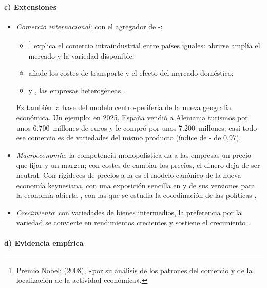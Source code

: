 \documentclass[11pt]{article}
\begin{document}
\paragraph{c) Extensiones}

\begin{itemize}
\item \emph{Comercio internacional}: con el agregador de -:
  \begin{itemize}
  \item \textcite{Krugman1979Increasing}\footnote{Premio Nobel:  (2008), «por su análisis de los patrones del comercio y de la localización de la actividad económica»\nocite{Nobel2008Krugman}.} explica el comercio intraindustrial entre países iguales: abrirse amplía el mercado y la variedad disponible;
  \item \textcite{Krugman1980Scale} añade los costes de transporte y el efecto del mercado doméstico;
  \item y \textcite{Melitz2003Impact}, las empresas heterogéneas .
  \end{itemize}
  Es también la base del modelo centro-periferia de la nueva geografía económica\nocite{Krugman1991Increasing}. Un ejemplo: en 2025, España vendió a Alemania turismos por unos 6.700~millones de euros y le compró por unos 7.200~millones; casi todo ese comercio es de variedades del mismo producto (índice de - de 0,97)\nocite{Eurostat2026ComextHS}.
\item \emph{Macroeconomía}: la competencia monopolística da a las empresas un precio que fijar y un margen; con costes de cambiar los precios, el dinero deja de ser neutral\nocite{BlanchardKiyotaki1987Monopolistic}. Con rigideces de precios a la \textcite{Calvo1983Staggered} es el modelo canónico de la nueva economía keynesiana\nocite{Gali2015Monetary}, con una exposición sencilla en \textcite{PoutineauSobczakVermandel2015Analytics}  y de sus versiones para la economía abierta , con las que se estudia la coordinación de las políticas .
\item \emph{Crecimiento}: con variedades de bienes intermedios, la preferencia por la variedad se convierte en rendimientos crecientes y sostiene el crecimiento\nocite{Romer1990Endogenous} .
\end{itemize}

\paragraph{d) Evidencia empírica}
\end{document}
